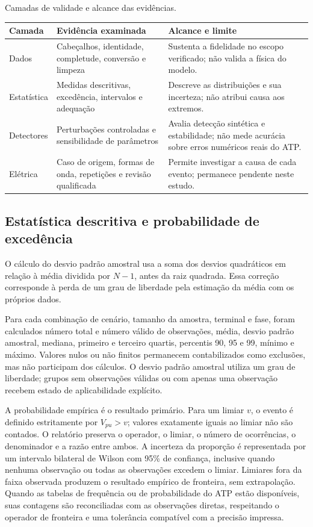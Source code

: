 \documentclass[
	12pt,				%
	openright,			%
	oneside,			%
	a4paper,			%
	chapter=TITLE,		%
	section=TITLE,		%
	subsection=TITLE,	%
	subsubsection=TITLE,%
	english,			%
	brazilian			%
	]{abntex2}
\theoremstyle{definition}
\begin{document}
\begin{quadro}[htbp]
\centering
\caption{Camadas de validade e alcance das evidências.}
\label{qua:camadas-validade}
\small
\renewcommand{\arraystretch}{1.15}
\begin{tabularx}{\textwidth}
    {|>{\RaggedRight\arraybackslash}p{2.1cm}|L|L|}
\hline
\textbf{Camada} & \textbf{Evidência examinada} &
\textbf{Alcance e limite} \\
\hline
Dados & Cabeçalhos, identidade, completude, conversão e limpeza &
Sustenta a fidelidade no escopo verificado; não valida a física do modelo.
\\
\hline
Estatística & Medidas descritivas, excedência, intervalos e adequação &
Descreve as distribuições e sua incerteza; não atribui causa aos extremos.
\\
\hline
Detectores & Perturbações controladas e sensibilidade de parâmetros &
Avalia detecção sintética e estabilidade; não mede acurácia sobre erros
numéricos reais do ATP. \\
\hline
Elétrica & Caso de origem, formas de onda, repetições e revisão qualificada &
Permite investigar a causa de cada evento; permanece pendente neste estudo.
\\
\hline
\end{tabularx}
\end{quadro}

\subsection{Estatística descritiva e probabilidade de excedência}
\label{sec:metodo-estatistico}

O cálculo do desvio padrão amostral usa a soma dos desvios quadráticos
em relação à média dividida por $N-1$, antes da raiz quadrada. Essa
correção corresponde à perda de um grau de liberdade pela estimação da
média com os próprios dados.

Para cada combinação de cenário, tamanho da amostra, terminal e fase, foram
calculados número total e número válido de observações, média, desvio padrão
amostral, mediana, primeiro e terceiro quartis, percentis 90, 95 e 99, mínimo
e máximo. Valores nulos ou não finitos permanecem contabilizados como
exclusões, mas não participam dos cálculos. O desvio padrão amostral utiliza
um grau de liberdade; grupos sem observações válidas ou com apenas uma
observação recebem estado de aplicabilidade explícito.

A probabilidade empírica é o resultado primário. Para um limiar $v$, o evento
é definido estritamente por $V_{pu}>v$; valores exatamente iguais ao limiar
não são contados. O relatório preserva o operador, o limiar, o número de
ocorrências, o denominador e a razão entre ambos. A incerteza da proporção é
representada por um intervalo bilateral de Wilson com 95\% de confiança,
inclusive quando nenhuma observação ou todas as observações excedem o limiar.
Limiares fora da faixa observada produzem o resultado empírico de fronteira,
sem extrapolação. Quando as tabelas de frequência ou de probabilidade do ATP
estão disponíveis, suas contagens são reconciliadas com as observações
diretas, respeitando o operador de fronteira e uma tolerância compatível com
a precisão impressa.
\end{document}

